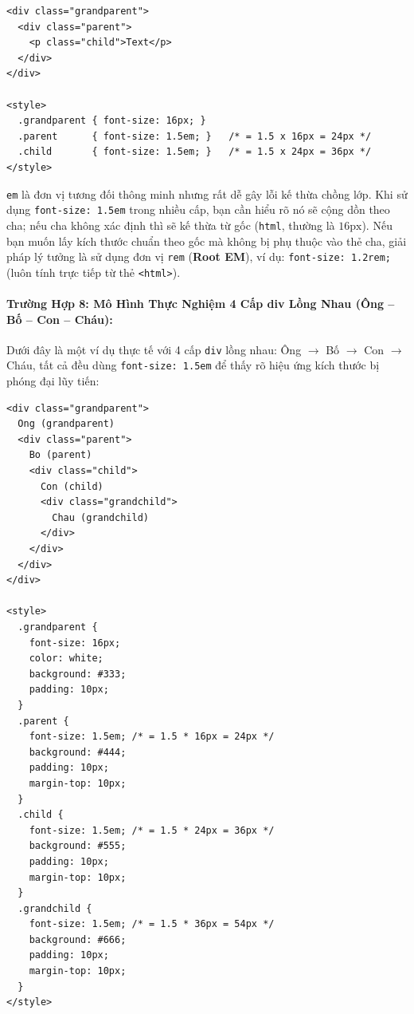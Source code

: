 \documentclass[11pt,oneside]{book}
\newcommand{\codeinline}[1]{\textcolor{accentOrange}{\texttt{#1}}}
\newcommand{\term}[1]{\textbf{\textcolor{primaryBlue}{#1}}}
\begin{document}
\begin{codeWindow}
\begin{lstlisting}[language=HTML5]
<div class="grandparent">
  <div class="parent">
    <p class="child">Text</p>
  </div>
</div>

<style>
  .grandparent { font-size: 16px; }
  .parent      { font-size: 1.5em; }   /* = 1.5 x 16px = 24px */
  .child       { font-size: 1.5em; }   /* = 1.5 x 24px = 36px */
</style>
\end{lstlisting}
\end{codeWindow}

\begin{conceptBox}
\codeinline{em} là đơn vị tương đối thông minh nhưng rất dễ gây lỗi kế thừa chồng lớp. Khi sử dụng \codeinline{font-size: 1.5em} trong nhiều cấp, bạn cần hiểu rõ nó sẽ cộng dồn theo cha; nếu cha không xác định thì sẽ kế thừa từ gốc (\codeinline{html}, thường là $16\text{px}$). Nếu bạn muốn lấy kích thước chuẩn theo gốc mà không bị phụ thuộc vào thẻ cha, giải pháp lý tưởng là sử dụng đơn vị \codeinline{rem} (\term{Root EM}), ví dụ: \codeinline{font-size: 1.2rem;} (luôn tính trực tiếp từ thẻ \codeinline{<html>}).
\end{conceptBox}

\paragraph{Trường Hợp 8: Mô Hình Thực Nghiệm 4 Cấp div Lồng Nhau (Ông -- Bố -- Con -- Cháu):}
Dưới đây là một ví dụ thực tế với 4 cấp \codeinline{div} lồng nhau: Ông $\rightarrow$ Bố $\rightarrow$ Con $\rightarrow$ Cháu, tất cả đều dùng \codeinline{font-size: 1.5em} để thấy rõ hiệu ứng kích thước bị phóng đại lũy tiến:

\begin{codeWindow}
\begin{lstlisting}[language=HTML5]
<div class="grandparent">
  Ong (grandparent)
  <div class="parent">
    Bo (parent)
    <div class="child">
      Con (child)
      <div class="grandchild">
        Chau (grandchild)
      </div>
    </div>
  </div>
</div>

<style>
  .grandparent {
    font-size: 16px;
    color: white;
    background: #333;
    padding: 10px;
  }
  .parent {
    font-size: 1.5em; /* = 1.5 * 16px = 24px */
    background: #444;
    padding: 10px;
    margin-top: 10px;
  }
  .child {
    font-size: 1.5em; /* = 1.5 * 24px = 36px */
    background: #555;
    padding: 10px;
    margin-top: 10px;
  }
  .grandchild {
    font-size: 1.5em; /* = 1.5 * 36px = 54px */
    background: #666;
    padding: 10px;
    margin-top: 10px;
  }
</style>
\end{lstlisting}
\end{codeWindow}
\end{document}
